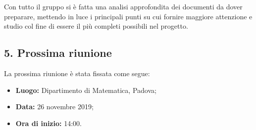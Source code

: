 Con tutto il gruppo si è fatta una analisi approfondita dei documenti da dover preparare, mettendo in luce i principali punti su cui fornire maggiore attenzione e studio col fine di essere il più completi possibili nel progetto.

\subsection*{5. Prossima riunione}

La prossima riunione è stata fissata come segue:
\begin{itemize}
	\item \textbf{Luogo:} Dipartimento di Matematica, Padova;

	\item \textbf{Data:} 26 novembre 2019;

	\item \textbf{Ora di inizio:} 14:00.
\end{itemize}
